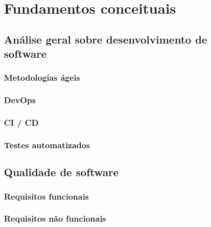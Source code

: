 \documentclass[]{../class/politex}
\begin{document}
  \capa
  \falsafolhaderosto
  \folhaderosto

  \sumario

  \begin{resumo}
  \end{resumo}

  \begin{abstract}
  \end{abstract}

  

  

  

  \chapter{Fundamentos conceituais}

    \section{Análise geral sobre desenvolvimento de software}

      \subsection{Metodologias ágeis}

      \subsection{DevOps}

      \subsection{CI / CD}

      \subsection{Testes automatizados}

    \section{Qualidade de software}

      \subsection{Requisitos funcionais}

      \subsection{Requisitos não funcionais}
\end{document}
